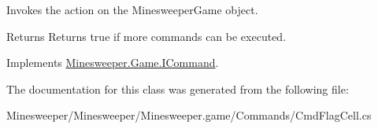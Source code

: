 Invokes the action on the Minesweeper\+Game object. 

\begin{DoxyReturn}{Returns}
Returns true if more commands can be executed.
\end{DoxyReturn}


Implements \hyperlink{interface_minesweeper_1_1_game_1_1_i_command_a03482e68480cad46a8cf419a87440cc9}{Minesweeper.\+Game.\+I\+Command}.



The documentation for this class was generated from the following file\+:\begin{DoxyCompactItemize}
\item 
Minesweeper/\+Minesweeper/\+Minesweeper.\+game/\+Commands/Cmd\+Flag\+Cell.\+cs\end{DoxyCompactItemize}
